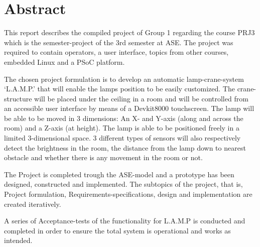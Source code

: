 \chapter*{Abstract}

This report describes the compiled project of Group 1 regarding the course PRJ3 which is the semester-project of the 3rd semester at ASE. The project was required to contain operators, a user interface, topics from other courses, embedded Linux and a PSoC platform.

The chosen project formulation is to develop an automatic lamp-crane-system ‘L.A.M.P.’ that will enable the lamps position to be easily customized. The crane-structure will be placed under the ceiling in a room and will be controlled from an accessible user interface by means of a Devkit8000 touchscreen. The lamp will be able to be moved in 3 dimensions: An X- and Y-axis (along and across the room) and a Z-axis (at height). The lamp is able to be positioned freely in a limited 3-dimensional space. 3 different types of sensors will also respectively detect the brightness in the room, the distance from the lamp down to nearest obstacle and whether there is any movement in the room or not.

The Project is completed trough the ASE-model and a prototype has been designed, constructed and implemented. The subtopics of the project, that is, Project formulation, Requirements-specifications, design and implementation are created iteratively.

A series of Acceptance-tests of the functionality for L.A.M.P is conducted and completed in order to ensure the total system is operational and works as intended.